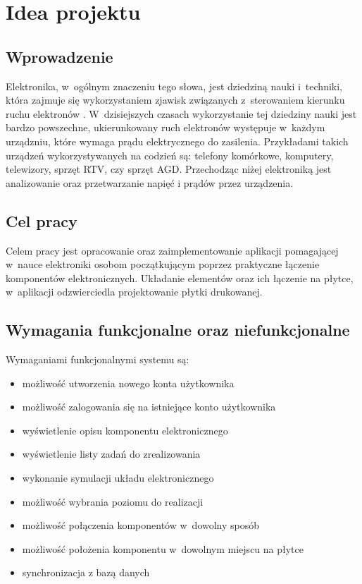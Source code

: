 \documentclass[12pt,a4paper]{article} %
\begin{document}


\tableofcontents

\clearpage
\section{Idea projektu}

\subsection{Wprowadzenie}
\aka Elektronika, w~ogólnym znaczeniu tego słowa, jest dziedziną nauki i~techniki, która zajmuje się wykorzystaniem zjawisk związanych z~sterowaniem kierunku ruchu elektronów \cite{definicja_elektornika}. W~dzisiejszych czasach wykorzystanie tej dziedziny nauki jest bardzo powszechne, ukierunkowany ruch elektronów występuje w~każdym urządzniu, które wymaga prądu elektrycznego do zasilenia. Przykładami takich urządzeń wykorzystywanych na codzień są: telefony komórkowe, komputery, telewizory, sprzęt RTV, czy sprzęt AGD. Przechodząc niżej elektroniką jest analizowanie oraz przetwarzanie napięć i prądów przez urządzenia.

\subsection{Cel pracy}
\aka Celem pracy jest opracowanie oraz zaimplementowanie aplikacji pomagającej w~nauce elektroniki osobom początkującym poprzez praktyczne łączenie komponentów elektronicznych. Układanie elementów oraz ich łączenie na płytce, w~aplikacji odzwierciedla projektowanie płytki drukowanej. 

\subsection{Wymagania funkcjonalne oraz niefunkcjonalne}
Wymaganiami funkcjonalnymi systemu są:
\begin{itemize}[nosep]
	\item możliwość utworzenia nowego konta użytkownika
	\item możliwość zalogowania się na istniejące konto użytkownika
	\item wyświetlenie opisu komponentu elektronicznego
	\item wyświetlenie listy zadań do zrealizowania
	\item wykonanie symulacji układu elektronicznego
	\item możliwość wybrania poziomu do realizacji
	\item możliwość połączenia komponentów w~dowolny sposób
	\item możliwość położenia komponentu w~dowolnym miejscu na płytce
	\item synchronizacja z bazą danych
\end{itemize}
\end{document}
